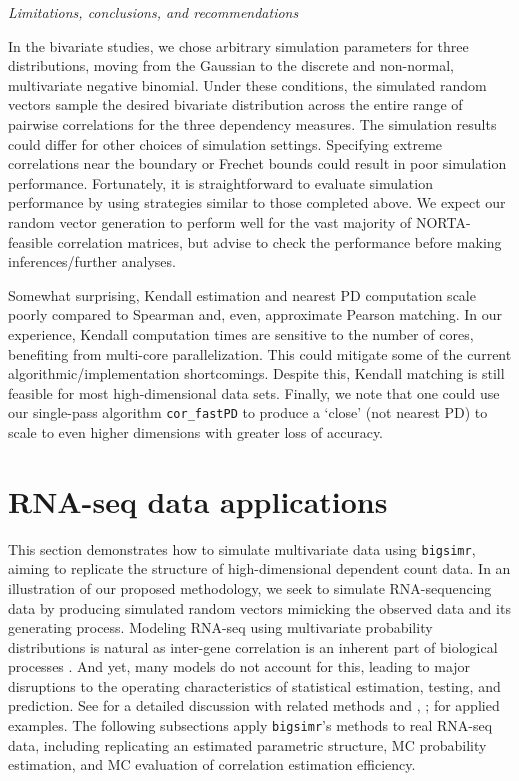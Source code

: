 \documentclass[
]{jss}
\begin{document}
\emph{Limitations, conclusions, and recommendations}

In the bivariate studies, we chose arbitrary simulation parameters for
three distributions, moving from the Gaussian to the discrete and
non-normal, multivariate negative binomial. Under these conditions, the
simulated random vectors sample the desired bivariate distribution
across the entire range of pairwise correlations for the three
dependency measures. The simulation results could differ for other
choices of simulation settings. Specifying extreme correlations near the
boundary or Frechet bounds could result in poor simulation performance.
Fortunately, it is straightforward to evaluate simulation performance by
using strategies similar to those completed above. We expect our random
vector generation to perform well for the vast majority of
NORTA-feasible correlation matrices, but advise to check the performance
before making inferences/further analyses.

Somewhat surprising, Kendall estimation and nearest PD computation scale
poorly compared to Spearman and, even, approximate Pearson matching. In
our experience, Kendall computation times are sensitive to the number of
cores, benefiting from multi-core parallelization. This could mitigate
some of the current algorithmic/implementation shortcomings. Despite
this, Kendall matching is still feasible for most high-dimensional data
sets. Finally, we note that one could use our single-pass algorithm
\texttt{cor\_fastPD} to produce a `close' (not nearest PD) to scale to
even higher dimensions with greater loss of accuracy.

\hypertarget{examples}{%
\section{RNA-seq data applications}\label{examples}}

This section demonstrates how to simulate multivariate data using
\texttt{bigsimr}, aiming to replicate the structure of high-dimensional
dependent count data. In an illustration of our proposed methodology, we
seek to simulate RNA-sequencing data by producing simulated random
vectors mimicking the observed data and its generating process. Modeling
RNA-seq using multivariate probability distributions is natural as
inter-gene correlation is an inherent part of biological processes
\citep{Wang2009b}. And yet, many models do not account for this, leading
to major disruptions to the operating characteristics of statistical
estimation, testing, and prediction. See \citet{Efron2012} for a
detailed discussion with related methods and \citet{Wu2012b},
\citet{Schissler2018}; \citet{Schissler2019} for applied examples. The
following subsections apply \texttt{bigsimr}'s methods to real RNA-seq
data, including replicating an estimated parametric structure, MC
probability estimation, and MC evaluation of correlation estimation
efficiency.
\end{document}
